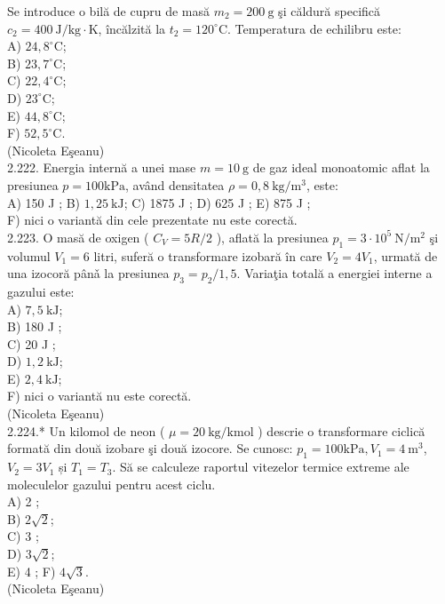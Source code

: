 \documentclass[10pt]{article}
\begin{document}
Se introduce o bilă de cupru de masă $m_{2}=200 \mathrm{~g}$ şi căldură specifică $c_{2}=400 \mathrm{~J} / \mathrm{kg} \cdot \mathrm{K}$, încălzită la $t_{2}=120^{\circ} \mathrm{C}$. Temperatura de echilibru este:\\
A) $24,8^{\circ} \mathrm{C}$;\\
B) $23,7^{\circ} \mathrm{C}$;\\
C) $22,4^{\circ} \mathrm{C}$;\\
D) $23^{\circ} \mathrm{C}$;\\
E) $44,8^{\circ} \mathrm{C}$;\\
F) $52,5^{\circ} \mathrm{C}$.\\
(Nicoleta Eşeanu)\\
2.222. Energia internă a unei mase $m=10 \mathrm{~g}$ de gaz ideal monoatomic aflat la presiunea $p=100 \mathrm{kPa}$, având densitatea $\rho=0,8 \mathrm{~kg} / \mathrm{m}^{3}$, este:\\
A) 150 J ; B) $1,25 \mathrm{~kJ}$; C) 1875 J ; D) 625 J ; E) 875 J ;\\
F) nici o variantă din cele prezentate nu este corectă.\\
2.223. O masă de oxigen ( $C_{V}=5 R / 2$ ), aflată la presiunea $p_{1}=3 \cdot 10^{5} \mathrm{~N} / \mathrm{m}^{2}$ şi volumul $V_{1}=6$ litri, suferă o transformare izobară în care $V_{2}=4 V_{1}$, urmată de una izocoră pânǎ la presiunea $p_{3}=p_{2} / 1,5$. Variaţia totală a energiei interne a gazului este:\\
A) $7,5 \mathrm{~kJ}$;\\
B) 180 J ;\\
C) 20 J ;\\
D) $1,2 \mathrm{~kJ}$;\\
E) $2,4 \mathrm{~kJ}$;\\
F) nici o variantă nu este corectă.\\
(Nicoleta Eşeanu)\\
2.224.* Un kilomol de neon ( $\mu=20 \mathrm{~kg} / \mathrm{kmol}$ ) descrie o transformare ciclică formată din două izobare şi două izocore. Se cunosc: $p_{1}=100 \mathrm{kPa}, V_{1}=4 \mathrm{~m}^{3}$, $V_{2}=3 V_{1}$ și $T_{1}=T_{3}$. Să se calculeze raportul vitezelor termice extreme ale moleculelor gazului pentru acest ciclu.\\
A) 2 ;\\
B) $2 \sqrt{2}$;\\
C) 3 ;\\
D) $3 \sqrt{2}$;\\
E) 4 ; F) $4 \sqrt{3}$.\\
(Nicoleta Eşeanu)\\
\end{document}
